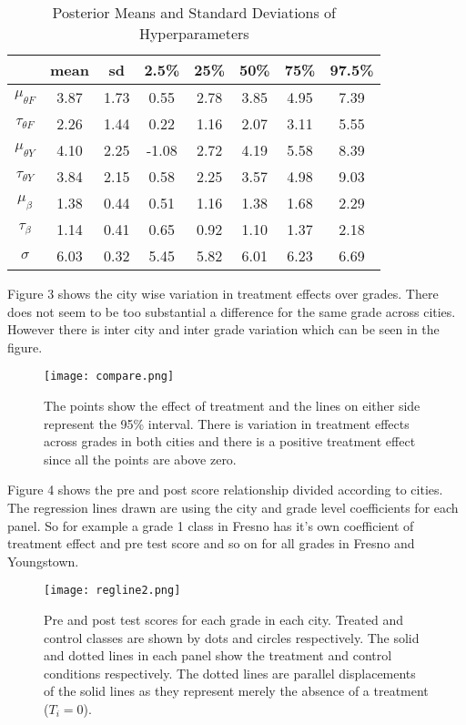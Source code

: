 \documentclass{article}
\begin{document}
\begin{table} [H]
\caption {Posterior Means and Standard Deviations of Hyperparameters}
\vspace{2mm}
\def\arraystretch{1.5}
\centering \begin{tabular}{c c c c c c c c} 
\hline\hline 
\vspace{1mm}
 & mean&  sd   & 2.5\%  &  25\% &   50\% &   75\% & 97.5\%\\  [0.5ex] \hline
$\mu_{\theta F}$    &    3.87 & 1.73  &  0.55  &  2.78  &  3.85  &  4.95  &  7.39   \\
$\tau_{\theta F}$    &      2.26  & 1.44  &  0.22  &  1.16  &  2.07  &  3.11  &  5.55 \\
$\mu_{\theta Y}$    &      4.10   & 2.25  & -1.08  &  2.72  &  4.19  &  5.58  &  8.39 \\
$\tau_{\theta Y}$    &      3.84 &  2.15  &  0.58  &  2.25  &  3.57  &  4.98  &  9.03 \\
$\mu_{\beta}$     &     1.38 &  0.44   & 0.51  &  1.16  &  1.38  &  1.68   & 2.29  \\
$\tau_{\beta}$     &     1.14 & 0.41   & 0.65  &  0.92  &  1.10   & 1.37  &  2.18  \\
$\sigma$               &     6.03 &  0.32  &  5.45 &   5.82  &  6.01  &  6.23  &  6.69 \\
\hline 
\end{tabular}
\end{table}
Figure 3 shows the city wise variation in treatment effects over grades. There does not seem to be too substantial a difference for the same grade across cities. However there is inter city and inter grade variation which can be seen in the figure.
\begin{figure}[H]
\centering
\texttt{[image: compare.png]}
\caption{The points show the effect of treatment and the lines on either side represent the 95\% interval. There is variation in treatment effects across grades in both cities and there is a positive treatment effect since all the points are above zero.}
\label{deltat}
\end{figure}
Figure 4 shows the pre and post score relationship divided according to cities. The regression lines drawn are using the city and grade level coefficients for each panel. So for example a grade 1 class in Fresno has it's own coefficient of treatment effect and pre test score and so on for all grades in Fresno and Youngstown.
\begin{figure}[H]
\centering
\texttt{[image: regline2.png]}
\caption{Pre and post test scores for each grade in each city. Treated and control classes are shown by dots and circles respectively. The solid and dotted lines in each panel show the treatment and control conditions respectively. The dotted lines are parallel displacements of the solid lines as they represent merely the absence of a treatment ($T_i = 0$).}
\label{deltat}
\end{figure}
\end{document}
